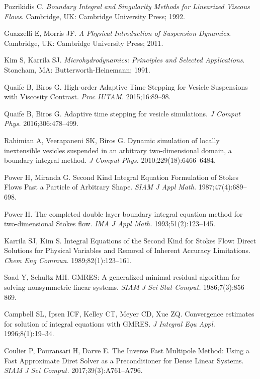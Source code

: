 \documentclass[AMA,STIX1COL]{WileyNJD-v2}
\begin{document}
\begin{thebibliography}{10}
Pozrikidis C. {\it Boundary Integral and Singularity Methods for Linearized
  Viscous Flows}.
\newblock Cambridge, UK: Cambridge University Press; 1992.

Guazzelli E, Morris JF. {\it {A Physical Introduction of Suspension Dynamics}}.
\newblock Cambridge, UK: Cambridge University Press; 2011.

Kim S, Karrila SJ. {\it Microhydrodynamics: Principles and Selected
  Applications}.
\newblock Stoneham, MA: Butterworth-Heinemann; 1991.

Quaife B, Biros G. {High-order Adaptive Time Stepping for Vesicle Suspensions
  with Viscosity Contrast}.  {\it Proc IUTAM. }2015;16:89--98.

Quaife B, Biros G. {Adaptive time stepping for vesicle simulations}.  {\it J
  Comput Phys. }2016;306:478--499.

Rahimian A, Veerapaneni SK, Biros G. Dynamic simulation of locally inextensible
  vesicles suspended in an arbitrary two-dimensional domain, a boundary
  integral method.  {\it J Comput Phys. }2010;229(18):6466--6484.

Power H, Miranda G. {Second Kind Integral Equation Formulation of Stokes Flows
  Past a Particle of Arbitrary Shape}.  {\it SIAM J Appl Math.
  }1987;47(4):689--698.

Power H. {The completed double layer boundary integral equation method for
  two-dimensional Stokes flow}.  {\it IMA J Appl Math. }1993;51(2):123--145.

Karrila SJ, Kim S. {Integral Equations of the Second Kind for Stokes Flow:
  Direct Solutions for Physical Variables and Removal of Inherent Accuracy
  Limitations}.  {\it Chem Eng Commun. }1989;82(1):123--161.

Saad Y, Schultz MH. {GMRES: A generalized minimal residual algorithm for
  solving nonsymmetric linear systems}.  {\it SIAM J Sci Stat Comput.
  }1986;7(3):856--869.

Campbell SL, Ipsen ICF, Kelley CT, Meyer CD, Xue ZQ. {Convergence estimates for
  solution of integral equations with GMRES}.  {\it J Integral Equ Appl.
  }1996;8(1):19--34.

Coulier P, Pouransari H, Darve E. {The Inverse Fast Multipole Method: Using a
  Fast Approximate Diret Solver as a Preconditioner for Dense Linear Systems}.
  {\it SIAM J Sci Comput. }2017;39(3):A761--A796.


\end{thebibliography}
\end{document}
